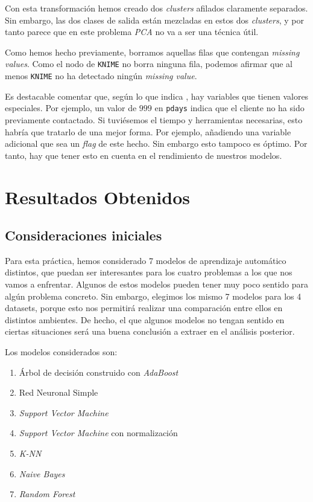 \documentclass[11pt]{article}
\begin{document}
Con esta transformación hemos creado dos \emph{clusters} afilados claramente separados. Sin embargo, las dos clases de salida están mezcladas en estos dos \emph{clusters}, y por tanto parece que en este problema \emph{PCA} no va a ser una técnica útil.

Como hemos hecho previamente, borramos aquellas filas que contengan \emph{missing values}. Como el nodo de \lstinline{KNIME} no borra ninguna fila, podemos afirmar que al menos \lstinline{KNIME} no ha detectado ningún \emph{missing value}.

Es destacable comentar que, según lo que indica \cite{bank_marketing_source:online}, hay variables que tienen valores especiales. Por ejemplo, un valor de $999$ en \lstinline{pdays} indica que el cliente no ha sido previamente contactado. Si tuviésemos el tiempo y herramientas necesarias, esto habría que tratarlo de una mejor forma. Por ejemplo, añadiendo una variable adicional que sea un \emph{flag} de este hecho. Sin embargo esto tampoco es óptimo. Por tanto, hay que tener esto en cuenta en el rendimiento de nuestros modelos.

\pagebreak

\section{Resultados Obtenidos} \label{resultados_brutos:seccion}

\subsection{Consideraciones iniciales} \label{cv_consideraciones:seccion}

Para esta práctica, hemos considerado 7 modelos de aprendizaje automático distintos, que puedan ser interesantes para los cuatro problemas a los que nos vamos a enfrentar. Algunos de estos modelos pueden tener muy poco sentido para algún problema concreto. Sin embargo, elegimos los mismo 7 modelos para los 4 datasets, porque esto nos permitirá realizar una comparación entre ellos en distintos ambientes. De hecho, el que algunos modelos no tengan sentido en ciertas situaciones será una buena conclusión a extraer en el análisis posterior.

Los modelos considerados son:

\begin{enumerate}
    \item Árbol de decisión construido con \emph{AdaBoost}
    \item Red Neuronal Simple
    \item \emph{Support Vector Machine}
    \item \emph{Support Vector Machine} con normalización
    \item \emph{K-NN}
    \item \emph{Naive Bayes}
    \item \emph{Random Forest}
\end{enumerate}
\end{document}

